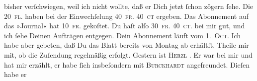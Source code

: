 \begin{ledgroupsized}[t]{13cm}
               bisher \strikeout{\textcolor{gray}{m}} verſchwiegen, weil ich
               nicht wollte, daß er Dich jetzt ſchon zögern ſehe.\pend
           \pstart
           Die \textsc{20 fl.} haben bei der Einwechſelung \textsc{40 fr. 40 ct} ergeben. Das Abonnement auf das »Journal« hat \textsc{10 fr.}
               gekoſtet. Du haſt alſo \textsc{30 fr. 40 ct.} bei mir gut,
               und ich ſehe Deinen Aufträgen entgegen. Dein Abonnement läuft vom 1. \textsc{Oct}. Ich habe aber gebeten, daß {\pb}Du das Blatt bereits von Montag ab
               erhältſt.  Theile mir mit, ob die Zuſendung
               regelmäßig erfolgt.\pend
           \pstart
           Gestern ist \textsc{Herzl}{ }\label{K_L02614-1v}\label{K_L02614-1h}. Er war
               bei mir und hat mir erzählt, er habe ſich insbeſondern mit \textsc{Burckhardt} angefreundet. Dieſen habe er

\end{ledgroupsized}
